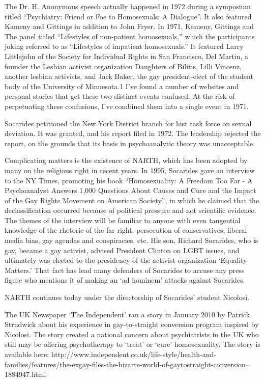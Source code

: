 \begin{refsection}
The Dr. H. Anonymous speech actually happened in 1972 during a symposium titled ``Psychiatry: Friend or Foe to Homosexuals: A Dialogue''. It also featured Kameny and Gittings in addition to John Fryer. In 1971, Kameny, Gittings and The panel titled ``Lifestyles of non-patient homosexuals,'' which the participants joking referred to as ``Lifestyles of impatient homosexuals.'' It featured Larry Littlejohn of the Society for Individual Rights in San Francisco, Del Martin, a founder the Lesbian activist organization Daughters of Bilitis, Lilli Vincenz, another lesbian activists, and Jack Baker, the gay president-elect of the student body of the University of Minnesota.1 I've found a number of websites and personal stories that get these two distinct events confused. At the risk of perpetuating these confusions, I've combined them into a single event in 1971.

Socarides petitioned the New York District branch for hist task force on sexual deviation. It was granted, and his report filed in 1972. The leadership rejected the report, on the grounds that its basis in psychoanalytic theory was unacceptable. 

Complicating matters is the existence of NARTH, which has been adopted by many on the religious right in recent years. In 1995, Socarides gave an interview to the NY Times, promoting his book ``Homosexuality: A Freedom Too Far - A Psychoanalyst Answers 1,000 Questions About Causes and Cure and the Impact of the Gay Rights Movement on American Society'', in which he claimed that the declassification occurred because of political pressure and not scientific evidence. The themes of the interview will be familiar to anyone with even tangential knowledge of the rhetoric of the far right: persecution of conservatives, liberal media bias, gay agendas and conspiracies, etc. His son, Richard Socarides, who is gay, became a gay activist, advised President Clinton on LGBT issues, and ultimately was elected to the presidency of the activist organization `Equality Matters.' That fact has lead many defenders of Socarides to accuse any press figure who mentions it of making an `ad hominem' attacks against Socarides. 

NARTH continues today under the directorship of Socarides' student Nicolosi.

The UK Newspaper `The Independent' ran a story in January 2010 by Patrick Strudwick about his experience in gay-to-straight conversion program inspired by Nicolosi. The story created a national concern about psychiatrists in the UK who still may be offering psychotherapy to `treat' or `cure' homosexuality. The story is available here: http:\slash \slash www.independent.co.uk\slash life-style\slash health-and-families\slash features\slash the-exgay-files-the-bizarre-world-of-gaytostraight-conversion--1884947.html


\end{refsection}
